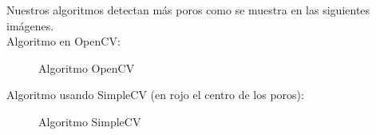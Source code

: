 Nuestros algoritmos detectan más poros como se muestra en las siguientes imágenes. \\
Algoritmo en OpenCV:

    \begin{figure}[H]
      \caption{Algoritmo OpenCV}
      \centering \setlength\fboxsep{0pt} \setlength\fboxrule{0.5pt}
    \end{figure}

Algoritmo usando SimpleCV (en rojo el centro de los poros):

    \begin{figure}[H]
      \caption{Algoritmo SimpleCV}
      \centering \setlength\fboxsep{0pt} \setlength\fboxrule{0.5pt}
    \end{figure}

